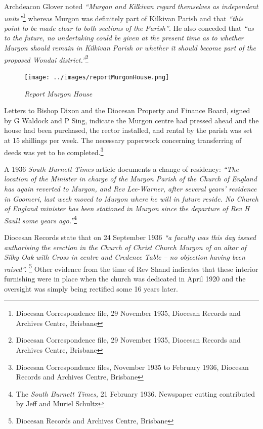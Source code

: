 Archdeacon Glover noted \emph{``Murgon and Kilkivan regard themselves as independent units''}\footnote{Diocesan Correspondence file, 29 November 1935, Diocesan Records and Archives Centre, Brisbane} whereas Murgon was definitely part of Kilkivan Parish and that \emph{``this point to be made clear to both sections of the Parish''}. He also conceded that \emph{``as to the future, no undertaking could be given at the present time as to whether Murgon should remain in Kilkivan Parish or whether it should become part of the proposed Wondai district.''}\footnote{Diocesan Correspondence file, 29 November 1935, Diocesan Records and Archives Centre, Brisbane}








\begin{figure}[!htb]
\begin{center}
\texttt{[image: ../images/reportMurgonHouse.png]}
\caption{\itshape Report Murgon House}
\end{center}
\end{figure}




Letters to Bishop Dixon and the Diocesan Property and Finance Board, signed by G Waldock and P Sing, indicate the Murgon centre had pressed ahead and the house had been purchased, the rector installed, and rental by the parish was set at 15 shillings per week. The necessary paperwork concerning transferring of deeds was yet to be completed.\footnote{Diocesan Correspondence files, November 1935 to February 1936, Diocesan Records and Archives Centre, Brisbane}


A 1936 \emph{South Burnett Times} article documents a change of residency: \emph{``The location of the Minister in charge of the Murgon Parish of the Church of England has again reverted to Murgon, and Rev Lee-Warner, after several years' residence in Goomeri, last week moved to Murgon where he will in future reside. No Church of England minister has been stationed in Murgon since the departure of Rev H Saull some years ago.''}\footnote{The \emph{South Burnett Times,} 21 February 1936. Newspaper cutting contributed by Jeff and Muriel Schultz}


\smallskip


Diocesan Records state that on 24 September 1936 \emph{``a faculty was this day issued authorising the erection in the Church of Christ Church Murgon of an altar of Silky Oak with Cross in centre and Credence Table -- no objection having been raised''.} \footnote{Diocesan Records and Archives Centre, Brisbane} Other evidence from the time of Rev Shand indicates that these interior furnishing were in place when the church was dedicated in April 1920 and the oversight was simply being rectified some 16 years later.


